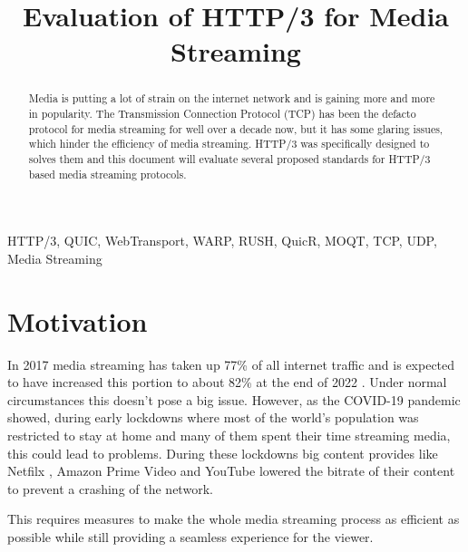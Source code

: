 \documentclass[conference]{IEEEtran}
\begin{document}
\title{Evaluation of HTTP/3 for Media Streaming}

\author{
}


\maketitle

\begin{abstract}
    Media is putting a lot of strain on the internet network and is gaining more and more in popularity. The Transmission Connection Protocol (TCP) has been the defacto protocol for media streaming for well over a decade now, but it has some glaring issues, which hinder the efficiency of media streaming. HTTP/3 was specifically designed to solves them and this document will evaluate several proposed standards for HTTP/3 based media streaming protocols.
\end{abstract}

\begin{IEEEkeywords}
HTTP/3, QUIC, WebTransport, WARP, RUSH, QuicR, MOQT, TCP, UDP, Media Streaming
\end{IEEEkeywords}

\section{Motivation}
In 2017 media streaming has taken up 77\% \cite{b1} of all internet traffic and is expected to have increased this portion to about 82\% at the end of 2022 \cite{b1}. Under normal circumstances this doesn't pose a big issue. However, as the COVID-19 pandemic showed, during early lockdowns where most of the world's population was restricted to stay at home and many of them spent their time streaming media, this could lead to problems. During these lockdowns big content provides like Netfilx \cite{b2}, Amazon Prime Video and YouTube \cite{b3} lowered the bitrate of their content to prevent a crashing of the network.

This requires measures to make the whole media streaming process as efficient as possible while still providing a seamless experience for the viewer.
\end{document}
